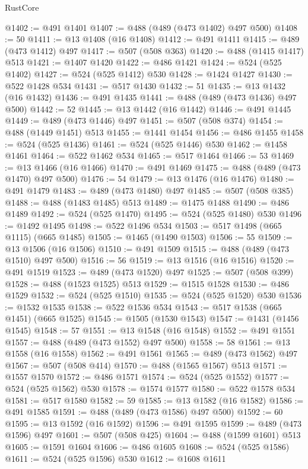 \begin{lexlean}{RustCore}
\begin{coremodule}
@1402 := @491 @1401
@1407 := @488 (@489 (@473 @1402) @497 @500)
@1408 := 50
@1411 := @13 @1408 (@16 @1408)
@1412 := @491 @1411
@1415 := @489 (@473 @1412) @497
@1417 := @507 (@508 @363)
@1420 := @488 (@1415 @1417) @513
@1421 := @1407 @1420
@1422 := @486 @1421
@1424 := @524 (@525 @1402)
@1427 := @524 (@525 @1412) @530
@1428 := @1424 @1427
@1430 := @522 @1428 @534
@1431 := @517 @1430
@1432 := 51
@1435 := @13 @1432 (@16 @1432)
@1436 := @491 @1435
@1441 := @488 (@489 (@473 @1436) @497 @500)
@1442 := 52
@1445 := @13 @1442 (@16 @1442)
@1446 := @491 @1445
@1449 := @489 (@473 @1446) @497
@1451 := @507 (@508 @374)
@1454 := @488 (@1449 @1451) @513
@1455 := @1441 @1454
@1456 := @486 @1455
@1458 := @524 (@525 @1436)
@1461 := @524 (@525 @1446) @530
@1462 := @1458 @1461
@1464 := @522 @1462 @534
@1465 := @517 @1464
@1466 := 53
@1469 := @13 @1466 (@16 @1466)
@1470 := @491 @1469
@1475 := @488 (@489 (@473 @1470) @497 @500)
@1476 := 54
@1479 := @13 @1476 (@16 @1476)
@1480 := @491 @1479
@1483 := @489 (@473 @1480) @497
@1485 := @507 (@508 @385)
@1488 := @488 (@1483 @1485) @513
@1489 := @1475 @1488
@1490 := @486 @1489
@1492 := @524 (@525 @1470)
@1495 := @524 (@525 @1480) @530
@1496 := @1492 @1495
@1498 := @522 @1496 @534
@1503 := @517 @1498 (@665 @1115) (@665 @1485)
@1505 := @1465 (@1490 @1503)
@1506 := 55
@1509 := @13 @1506 (@16 @1506)
@1510 := @491 @1509
@1515 := @488 (@489 (@473 @1510) @497 @500)
@1516 := 56
@1519 := @13 @1516 (@16 @1516)
@1520 := @491 @1519
@1523 := @489 (@473 @1520) @497
@1525 := @507 (@508 @399)
@1528 := @488 (@1523 @1525) @513
@1529 := @1515 @1528
@1530 := @486 @1529
@1532 := @524 (@525 @1510)
@1535 := @524 (@525 @1520) @530
@1536 := @1532 @1535
@1538 := @522 @1536 @534
@1543 := @517 @1538 (@665 @1451) (@665 @1525)
@1545 := @1505 (@1530 @1543)
@1547 := @1431 (@1456 @1545)
@1548 := 57
@1551 := @13 @1548 (@16 @1548)
@1552 := @491 @1551
@1557 := @488 (@489 (@473 @1552) @497 @500)
@1558 := 58
@1561 := @13 @1558 (@16 @1558)
@1562 := @491 @1561
@1565 := @489 (@473 @1562) @497
@1567 := @507 (@508 @414)
@1570 := @488 (@1565 @1567) @513
@1571 := @1557 @1570
@1572 := @486 @1571
@1574 := @524 (@525 @1552)
@1577 := @524 (@525 @1562) @530
@1578 := @1574 @1577
@1580 := @522 @1578 @534
@1581 := @517 @1580
@1582 := 59
@1585 := @13 @1582 (@16 @1582)
@1586 := @491 @1585
@1591 := @488 (@489 (@473 @1586) @497 @500)
@1592 := 60
@1595 := @13 @1592 (@16 @1592)
@1596 := @491 @1595
@1599 := @489 (@473 @1596) @497
@1601 := @507 (@508 @425)
@1604 := @488 (@1599 @1601) @513
@1605 := @1591 @1604
@1606 := @486 @1605
@1608 := @524 (@525 @1586)
@1611 := @524 (@525 @1596) @530
@1612 := @1608 @1611

\end{coremodule}
\end{lexlean}
